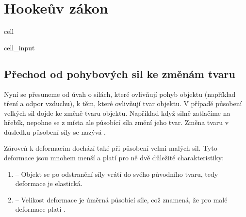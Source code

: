 \documentclass[letterpaper,10pt,english]{jupyterBook}
\begin{document}
\sphinxstepscope


\section{Hookeův zákon}
\label{\detokenize{Prednasky/2_2_Hooke_u016fv_z_xe1kon:hookeuv-zakon}}\label{\detokenize{Prednasky/2_2_Hooke_u016fv_z_xe1kon::doc}}
\begin{sphinxuseclass}{cell}\begin{sphinxVerbatimInput}

\begin{sphinxuseclass}{cell_input}
\begin{sphinxVerbatim}[commandchars=\\\{\}]
   
   
\end{sphinxVerbatim}

\end{sphinxuseclass}\end{sphinxVerbatimInput}

\end{sphinxuseclass}

\subsection{Přechod od pohybových sil ke změnám tvaru}
\label{\detokenize{Prednasky/2_2_Hooke_u016fv_z_xe1kon:prechod-od-pohybovych-sil-ke-zmenam-tvaru}}
\sphinxAtStartPar
Nyní se přesuneme od úvah o silách, které ovlivňují pohyb objektu (například tření a odpor vzduchu), k těm, které ovlivňují tvar objektu. V případě působení velkých sil dojde ke změně tvaru objektu. Například když silně zatlačíme na hřebík, nepohne se z místa ale působící síla změní jeho tvar. Změna tvaru v důsledku působení síly se nazývá .

\noindent{}

\sphinxAtStartPar
Zároveň k deformacím dochází také při působení velmi malých sil. Tyto deformace jsou mnohem menší a platí pro ně dvě důležité charakteristiky:
\begin{enumerate}
%
\item {} 
\sphinxAtStartPar
{} – Objekt se po odstranění síly vrátí do svého původního tvaru, tedy deformace je elastická.

\item {} 
\sphinxAtStartPar
{} – Velikost deformace je úměrná působící síle, což znamená, že pro malé deformace platí .

\end{enumerate}
\end{document}
